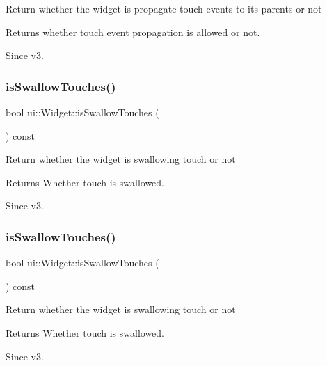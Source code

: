 Return whether the widget is propagate touch events to its parents or not \begin{DoxyReturn}{Returns}
whether touch event propagation is allowed or not. 
\end{DoxyReturn}
\begin{DoxySince}{Since}
v3. 
\end{DoxySince}
\mbox{\label{classui_1_1Widget_aa2dab2eca5024f96792a40f5de49f415}} 
\subsubsection{\texorpdfstring{is\+Swallow\+Touches()}{isSwallowTouches()}\hspace{0.1cm}{\footnotesize\ttfamily [1/2]}}
{\footnotesize\ttfamily bool ui\+::\+Widget\+::is\+Swallow\+Touches (\begin{DoxyParamCaption}{ }\end{DoxyParamCaption}) const}

Return whether the widget is swallowing touch or not \begin{DoxyReturn}{Returns}
Whether touch is swallowed. 
\end{DoxyReturn}
\begin{DoxySince}{Since}
v3. 
\end{DoxySince}
\mbox{\label{classui_1_1Widget_aa2dab2eca5024f96792a40f5de49f415}} 
\subsubsection{\texorpdfstring{is\+Swallow\+Touches()}{isSwallowTouches()}\hspace{0.1cm}{\footnotesize\ttfamily [2/2]}}
{\footnotesize\ttfamily bool ui\+::\+Widget\+::is\+Swallow\+Touches (\begin{DoxyParamCaption}{ }\end{DoxyParamCaption}) const}

Return whether the widget is swallowing touch or not \begin{DoxyReturn}{Returns}
Whether touch is swallowed. 
\end{DoxyReturn}
\begin{DoxySince}{Since}
v3. 
\end{DoxySince}
\mbox{\label{classui_1_1Widget_aad4e2d18440585570baae60a85d5f97a}} 
